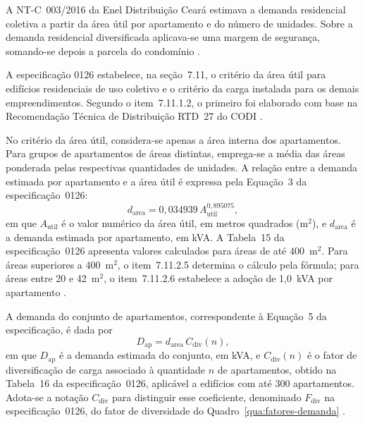 A NT-C~003/2016 da Enel Distribuição Ceará estimava a demanda residencial coletiva a partir da área útil por apartamento e do número de unidades. Sobre a demanda residencial diversificada aplicava-se uma margem de segurança, somando-se depois a parcela do condomínio \cite[item~14.2]{enel0032016}.

A especificação 0126 estabelece, na seção~7.11, o critério da área útil para edifícios residenciais de uso coletivo e o critério da carga instalada para os demais empreendimentos. Segundo o item~7.11.1.2, o primeiro foi elaborado com base na Recomendação Técnica de Distribuição RTD~27 do CODI \cite[itens~7.11.1 e~7.11.2]{enel0126}.

No critério da área útil, considera-se apenas a área interna dos apartamentos. Para grupos de apartamentos de áreas distintas, emprega-se a média das áreas ponderada pelas respectivas quantidades de unidades. A relação entre a demanda estimada por apartamento e a área útil é expressa pela Equação~3 da especificação~0126:
\begin{equation}
 d_{\mathrm{area}}=0{,}034939\,A_{\mathrm{util}}^{0{,}895075},
 \label{eq:demanda-area}
\end{equation}
em que $A_{\mathrm{util}}$ é o valor numérico da área útil, em metros quadrados (\(\mathrm{m}^2\)), e $d_{\mathrm{area}}$ é a demanda estimada por apartamento, em kVA. A Tabela~15 da especificação~0126 apresenta valores calculados para áreas de até 400~\(\mathrm{m}^2\). Para áreas superiores a 400~\(\mathrm{m}^2\), o item~7.11.2.5 determina o cálculo pela fórmula; para áreas entre 20 e 42~\(\mathrm{m}^2\), o item~7.11.2.6 estabelece a adoção de 1,0~kVA por apartamento \cite[itens~7.11.2.3 a~7.11.2.6]{enel0126}.

A demanda do conjunto de apartamentos, correspondente à Equação~5 da especificação, é dada por
\begin{equation}
 D_{\mathrm{ap}}=d_{\mathrm{area}}\,C_{\mathrm{div}}(n),
 \label{eq:demanda-apartamentos}
\end{equation}
em que $D_{\mathrm{ap}}$ é a demanda estimada do conjunto, em kVA, e $C_{\mathrm{div}}(n)$ é o fator de diversificação de carga associado à quantidade $n$ de apartamentos, obtido na Tabela~16 da especificação~0126, aplicável a edifícios com até 300 apartamentos. Adota-se a notação $C_{\mathrm{div}}$ para distinguir esse coeficiente, denominado $F_{\mathrm{div}}$ na especificação~0126, do fator de diversidade do Quadro~\ref{qua:fatores-demanda} \cite[itens~7.11.2.7 e~7.11.2.8]{enel0126}.

